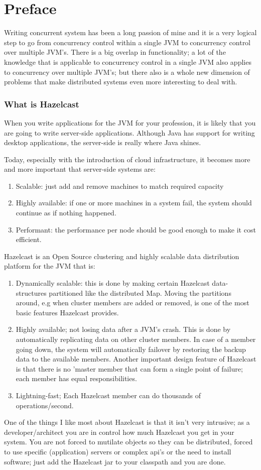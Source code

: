 \chapter*{Preface}
Writing concurrent system has been a long passion of mine and it is a very logical step to go from concurrency control within a single JVM to concurrency control over multiple JVM's. There is a big overlap in functionality; a lot of the knowledge that is applicable to concurrency control in a single JVM also applies to concurrency over multiple JVM's; but there also is a whole new dimension of problems that make distributed systems even more interesting to deal with. 
\subsection*{What is Hazelcast}
When you write applications for the JVM for your profession, it is likely that you are going to write server-side applications. Although Java has support for writing desktop applications, the server-side is really where Java shines.

Today, especially with the introduction of cloud infrastructure, it becomes more and more important that server-side systems are:
\begin{enumerate}
\item Scalable: just add and remove machines to match required capacity 
\item Highly available: if one or more machines in a system fail, the system should continue as if nothing happened.
\item Performant: the performance per node should be good enough to make it cost efficient.
\end{enumerate}

Hazelcast is an Open Source clustering and highly scalable data distribution platform for the JVM that is:
\begin{enumerate}
\item Dynamically scalable: this is done by making certain Hazelcast data-structures partitioned like the distributed Map. Moving the partitions around, e.g when cluster members are added or removed, is one of the most basic features Hazelcast provides. 
\item Highly available; not losing data after a JVM's crash. This is done by automatically replicating data on other cluster members. In case of a member going down, the system will automatically failover by restoring the backup data to the available members. Another important design feature of Hazelcast is that there is no 'master member that can form a single point of failure; each member has equal responsibilities.
\item Lightning-fast; Each Hazelcast member can do thousands of operations/second.
\end{enumerate}
One of the things I like most about Hazelcast is that it isn't very intrusive; as a developer/architect you are in control how much Hazelcast you get in your system. You are not forced to mutilate objects so they can be distributed, forced to use specific (application) servers or complex api's or the need to install software; just add the Hazelcast jar to your classpath and you are done.


